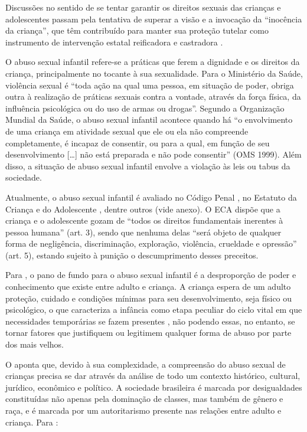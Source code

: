 
Discussões no sentido de se tentar garantir os direitos sexuais das crianças e adolescentes passam pela tentativa de superar a visão e a invocação da ``inocência da criança'', que têm contribuído para manter sua proteção tutelar como instrumento de intervenção  estatal reificadora e castradora .

O abuso sexual infantil refere-se a práticas que ferem a dignidade e os direitos da criança, principalmente no tocante à sua sexualidade. Para o Ministério da Saúde, violência sexual é ``toda ação na qual uma pessoa, em situação de poder, obriga outra à realização de práticas sexuais contra a vontade, através da força física, da influência psicológica ou do uso de armas ou drogas''. Segundo a Organização Mundial da Saúde, o abuso sexual infantil acontece quando há ``o envolvimento de uma criança em atividade sexual que ele ou ela não compreende completamente, é incapaz de consentir, ou para a qual, em função de seu desenvolvimento [\ldots] não está preparada e não pode consentir'' (OMS 1999). Além disso, a situação de abuso sexual infantil envolve a violação às leis ou tabus da sociedade. 

Atualmente, o abuso sexual infantil é avaliado no Código Penal \cite{BRASIL1940}, no Estatuto da Criança e do Adolescente \cite{BRASIL1990}, dentre outros (vide anexo). O ECA dispõe que a criança e o adolescente gozam de ``todos os direitos fundamentais inerentes à pessoa humana''  (art. 3), sendo que nenhuma delas ``será objeto de qualquer forma de negligência, discriminação, exploração, violência, crueldade e opressão'' (art. 5), estando sujeito à punição o descumprimento desses preceitos.

Para , o pano de fundo para o abuso sexual infantil é a desproporção de poder e conhecimento que existe entre adulto e criança. A criança espera de um adulto proteção, cuidado e condições mínimas para seu desenvolvimento, seja físico ou psicológico, o que caracteriza a infância como etapa peculiar do ciclo vital em que necessidades temporárias se fazem presentes \cite{TRINDADEBREIER2007}, não podendo essas, no entanto, se tornar fatores que justifiquem ou legitimem qualquer forma de abuso por parte dos mais velhos.

O  aponta que, devido à sua complexidade, a compreensão do abuso sexual de crianças precisa se dar através da análise de todo um contexto histórico, cultural, jurídico, econômico e político. A sociedade brasileira é marcada por desigualdades constituídas não apenas pela dominação de classes, mas também de gênero e raça, e é marcada por um autoritarismo presente nas relações entre adulto e criança. Para : 

